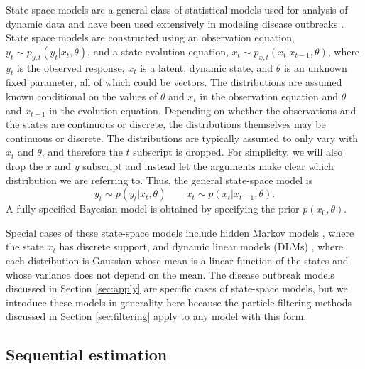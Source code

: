 \documentclass{elsarticle}
\begin{document}
State-space models are a general class of statistical models used for analysis of dynamic data and have been used extensively in modeling disease outbreaks \citep{Mart:Cone:Lope:Lope:baye:2008,watkins2009disease,merl2009statistical,ludkovski2010optimal,skvortsov2012monitoring}.  State space models are constructed using an observation equation, $y_t \sim p_{y,t}(y_t|x_t,\theta)$, and a state evolution equation, $x_t \sim p_{x,t}(x_t|x_{t-1},\theta)$, where $y_t$ is the observed response, $x_t$ is a latent, dynamic state, and $\theta$ is an unknown fixed parameter, all of which could be vectors. The distributions are assumed known conditional on the values of $\theta$ and $x_t$ in the observation equation and $\theta$ and $x_{t-1}$ in the evolution equation. Depending on whether the observations and the states are continuous or discrete, the distributions themselves may be continuous or discrete. The distributions are typically assumed to only vary with $x_t$ and $\theta$, and therefore the $t$ subscript is dropped.
For simplicity, we will also drop the $x$ and $y$ subscript and instead let the arguments make clear which distribution we are referring to. Thus, the general state-space model is
\[
y_t \sim p(y_t|x_t,\theta) \qquad
x_t \sim p(x_t|x_{t-1},\theta).
\]
A fully specified Bayesian model is obtained by specifying the prior $p(x_0,\theta)$.

Special cases of these state-space models include hidden Markov models \citep{cappe2005inference,petris2009dynamic}, where the state $x_t$ has discrete support, and dynamic linear models (DLMs) \citep{West:Harr:baye:1997}, where each distribution is Gaussian whose mean is a linear function of the states and whose variance does not depend on the mean. The disease outbreak models discussed in Section \ref{sec:apply} are specific cases of state-space models, but we introduce these models in generality here because the particle filtering methods discussed in Section \ref{sec:filtering} apply to any model with this form.

\subsection{Sequential estimation \label {sec:sequential}}
\end{document}
